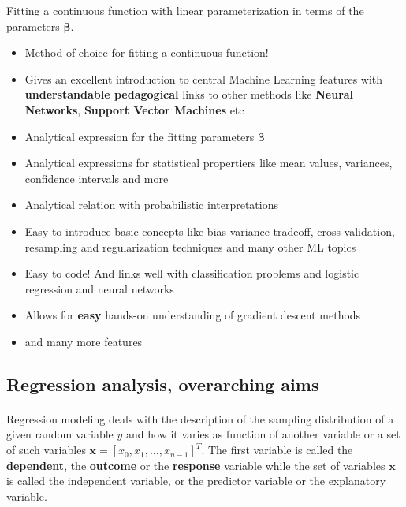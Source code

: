 \documentclass[%
oneside,                 %
final,                   %
10pt]{article}
\begin{document}
Fitting a continuous function with linear parameterization in terms of the parameters  $\bm{\beta}$.
\begin{itemize}
\item Method of choice for fitting a continuous function!

\item Gives an excellent introduction to central Machine Learning features with \textbf{understandable pedagogical} links to other methods like \textbf{Neural Networks}, \textbf{Support Vector Machines} etc

\item Analytical expression for the fitting parameters $\bm{\beta}$

\item Analytical expressions for statistical propertiers like mean values, variances, confidence intervals and more

\item Analytical relation with probabilistic interpretations 

\item Easy to introduce basic concepts like bias-variance tradeoff, cross-validation, resampling and regularization techniques and many other ML topics

\item Easy to code! And links well with classification problems and logistic regression and neural networks

\item Allows for \textbf{easy} hands-on understanding of gradient descent methods

\item and many more features
\end{itemize}

\noindent
\subsection*{Regression analysis, overarching aims}

\paragraph{}

Regression modeling deals with the description of  the sampling distribution of a given random variable $y$ and how it varies as function of another variable or a set of such variables $\bm{x} =[x_0, x_1,\dots, x_{n-1}]^T$. 
The first variable is called the \textbf{dependent}, the \textbf{outcome} or the \textbf{response} variable while the set of variables $\bm{x}$ is called the independent variable, or the predictor variable or the explanatory variable. 
\end{document}
